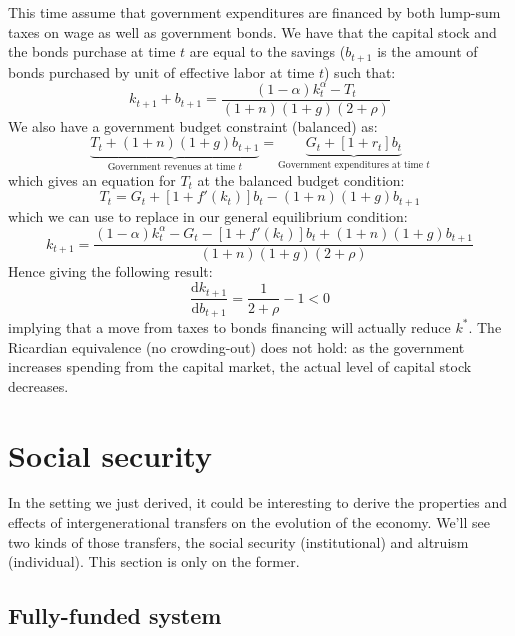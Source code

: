 \documentclass[12pt]{report}
\def\D{\mathrm{d}}
\begin{document}
This time assume that government expenditures are financed by both lump-sum taxes on wage as well as government bonds. We have that the capital stock and the bonds purchase at time $t$ are equal to the savings ($b_{t+1}$ is the amount of bonds purchased by unit of effective labor at time $t$) such that: $$k_{t+1} + b_{t+1} = \frac{(1-\alpha)k_t^\alpha - T_t}{(1+n)(1+g)(2+\rho)} $$ We also have a government budget constraint (balanced) as: $$\underbrace{T_t + (1+n)(1+g) b_{t+1}}_{\text{Government revenues at time }t} = \underbrace{G_t + [1 + r_t]b_t}_{\text{Government expenditures at time }t} $$ which gives an equation for $T_t$ at the balanced budget condition: $$ T_t = G_t + [1 + f'(k_{t})]b_t - (1+n)(1+g) b_{t+1} $$ which we can use to replace in our general equilibrium condition: $$k_{t+1} = \frac{(1-\alpha)k_t^\alpha - G_t - [1 + f'(k_{t})]b_t + (1+n)(1+g) b_{t+1}}{(1+n)(1+g)(2+\rho)} $$ Hence giving the following result: $$\frac{\D k_{t+1}}{\D b_{t+1}} = \frac{1}{2+\rho} - 1 < 0 $$ implying that a move from taxes to bonds financing will actually reduce $k^*$. The Ricardian equivalence (no crowding-out) does not hold: as the government increases spending from the capital market, the actual level of capital stock decreases.

\section{Social security}

In the setting we just derived, it could be interesting to derive the properties and effects of intergenerational transfers on the evolution of the economy. We'll see two kinds of those transfers, the social security (institutional) and altruism (individual). This section is only on the former.

\subsection{Fully-funded system}
\end{document}
